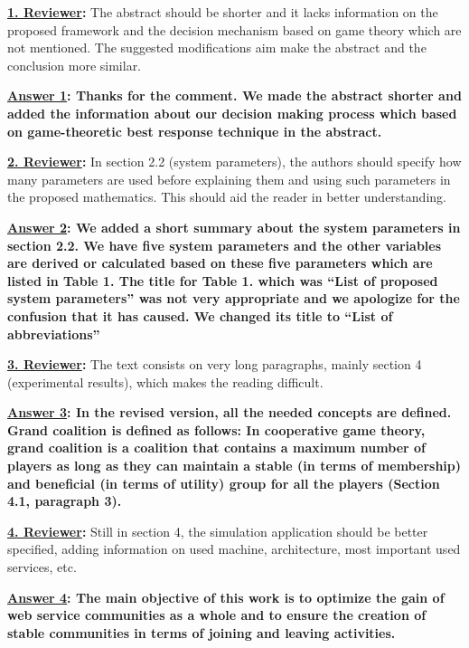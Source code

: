 \documentclass[times, 12pt,a4paper]{article}
\begin{document}
\vspace{0.5cm} \textbf{\underline{1. Reviewer}:} The abstract should be shorter and it lacks information on the proposed framework and the decision mechanism based on game theory which are not mentioned. The suggested modifications aim make the abstract and the conclusion more similar.

\vspace{0.2cm}\textbf{\underline{Answer 1}: Thanks for the
comment. We made the abstract shorter and added the information about our decision making process which based on game-theoretic best response technique in the abstract.}

\vspace{0.5cm}\textbf{\underline{2. Reviewer}:}  In section 2.2 (system parameters), the authors should specify how many parameters are used before explaining them and using such parameters in the proposed mathematics. This should aid the reader in better understanding.

\vspace{0.2cm}\textbf{\underline{Answer 2}: We added a short summary about the system parameters in section 2.2. We have five system parameters and the other variables are derived or calculated based on these five parameters which are listed in Table 1. The title for Table 1. which was ``List of proposed system parameters'' was not very appropriate and we apologize for the confusion that it has caused. We changed its title to ``List of abbreviations''}


\vspace{0.5cm}\textbf{\underline{3. Reviewer}:} The text consists on very long paragraphs, mainly section 4 (experimental results), which makes the reading difficult.

\vspace{0.2cm}\textbf{\underline{Answer 3}: In the revised
version, all the needed concepts are defined. Grand coalition is
defined as follows: In cooperative game theory, grand coalition is
a coalition that contains a maximum number of players as long as
they can maintain a stable (in terms of membership) and beneficial
(in terms of utility) group for all the players (Section 4.1,
paragraph 3).}


\vspace{0.5cm}\textbf{\underline{4. Reviewer}:} Still in section 4, the simulation application should be better specified, adding information on used machine, architecture, most important used services, etc.

\vspace{0.2cm}\textbf{\underline{Answer 4}: The main objective of
this work is to optimize the gain of web service communities as a
whole and to ensure the creation of stable communities in terms of
joining and leaving activities.}
\end{document}
